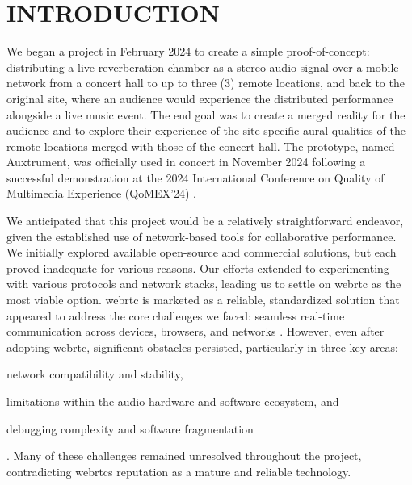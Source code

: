 \documentclass[fleqn]{jaes}
\begin{document}
\maketitle

\section{INTRODUCTION}
We began a project in February 2024 to create a simple proof-of-concept: distributing a live reverberation chamber as a stereo audio signal over a mobile network from a concert hall to up to three (3) remote locations, and back to the original site, where an audience would experience the distributed performance alongside a live music event. The end goal was to create a merged reality for the audience and to explore their experience of the site-specific aural qualities of the remote locations merged with those of the concert hall. The prototype, named Auxtrument, was officially used in concert in November 2024 following a successful demonstration at the 2024 International Conference on Quality of Multimedia Experience (QoMEX'24) \cite{franklin2024merging}.

We anticipated that this project would be a relatively straightforward endeavor, given the established use of network-based tools for collaborative performance. We initially explored available open-source and commercial solutions, but each proved inadequate for various reasons. Our efforts extended to experimenting with various protocols and network stacks, leading us to settle on \gls{webrtc} as the most viable option. \gls{webrtc} is marketed as a reliable, standardized solution that appeared to address the core challenges we faced: seamless real-time communication across devices, browsers, and networks \cite{loreto_real-time_2014}. However, even after adopting \gls{webrtc}, significant obstacles persisted, particularly in three key areas: \begin{inparaenum}[1)] \item network compatibility and stability, \item limitations within the audio hardware and software ecosystem, and \item debugging complexity and software fragmentation\end{inparaenum}. Many of these challenges remained unresolved throughout the project, contradicting \Glspl{webrtc} reputation as a mature and reliable technology.
\end{document}
